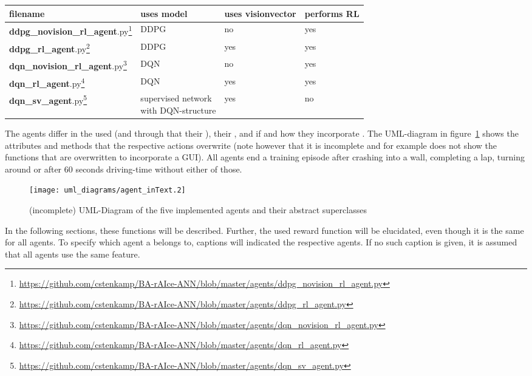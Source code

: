 \begin{flushleft}
\begin{tabular}{l l l l}
	filename & uses model & uses visionvector & performs RL\\
	\hline
	\textbf{ddpg\_novision\_rl\_agent}.py\footnote{\url{https://github.com/cstenkamp/BA-rAIce-ANN/blob/master/agents/ddpg_novision_rl_agent.py}} & DDPG & no & yes\\	
	\textbf{ddpg\_rl\_agent}.py\footnote{\url{https://github.com/cstenkamp/BA-rAIce-ANN/blob/master/agents/ddpg_rl_agent.py}} & DDPG & yes & yes\\
	\textbf{dqn\_novision\_rl\_agent}.py\footnote{\url{https://github.com/cstenkamp/BA-rAIce-ANN/blob/master/agents/dqn_novision_rl_agent.py}} & DQN & no & yes\\
	\textbf{dqn\_rl\_agent}.py\footnote{\url{https://github.com/cstenkamp/BA-rAIce-ANN/blob/master/agents/dqn_rl_agent.py}} & DQN & yes & yes\\
	\textbf{dqn\_sv\_agent}.py\footnote{\url{https://github.com/cstenkamp/BA-rAIce-ANN/blob/master/agents/dqn_sv_agent.py}} & \blap{supervised network\\ with DQN-structure} & yes & no\\[2em]
\end{tabular}
\end{flushleft}

The agents differ in the used  (and through that their ), their , and if and how they incorporate . The UML-diagram in figure~\ref{fig:umlAgents} shows the attributes and methods that the respective actions overwrite (note however that it is incomplete and for example does not show the functions that are overwritten to incorporate a GUI). All agents end a training episode after crashing into a wall, completing a lap, turning around or after $60$ seconds driving-time without either of those.

\begin{figure}[h]
	\centering 
	\texttt{[image: uml\_diagrams/agent\_inText.2]}  
	\caption[UML-Diagram of the implemented agents and their superclasses]{(incomplete) UML-Diagram of the five implemented agents and their abstract superclasses}
	\label{fig:umlAgents}
\end{figure}

In the following sections, these functions will be described. Further, the used reward function will be elucidated, even though it is the same for all agents. To specify which agent a  belongs to, captions will indicated the respective agents. If no such caption is given, it is assumed that all agents use the same feature.

